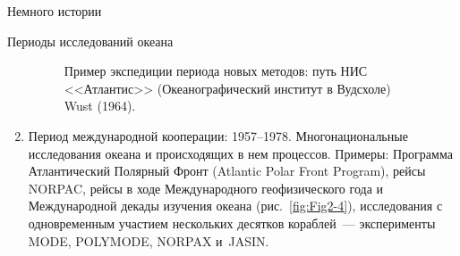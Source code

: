 \begin{chapter}{Немного истории}
\begin{section}{Периоды исследований океана}
\begin{enumerate}
\begin{figure}[t!]
\caption{Пример экспедиции периода новых методов: путь НИС <<Атлантис>>
(Океанографический институт в Вудсхоле) Wust (1964).}
\label{fig:Fig2-3}
\end{figure}
%
% 

\item
Период международной кооперации: 1957--1978.
Многонациональные исследования океана и происходящих в нем процессов.
Примеры: Программа Атлантический Полярный Фронт
(Atlantic Polar Front Program), рейсы NORPAC, рейсы в ходе
Международного геофизического года и Международной декады изучения
океана (рис.~\ref{fig:Fig2-4}), исследования с одновременным участием 
нескольких десятков кораблей~--- эксперименты MODE, POLYMODE, NORPAX и~JASIN.
%


\end{enumerate}
\end{section}
\end{chapter}
